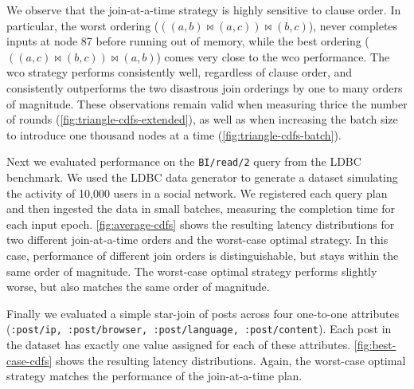 \documentclass[../catalog.tex]{subfiles}
\begin{document}
We observe that the join-at-a-time strategy is highly sensitive to
clause order. In particular, the worst ordering ($((a,b) \bowtie
(a,c)) \bowtie (b,c)$), never completes inputs at node 87 before
running out of memory, while the best ordering ($((a,c) \bowtie (b,c))
\bowtie (a,b)$) comes very close to the wco performance. The wco
strategy performs consistently well, regardless of clause order, and
consistently outperforms the two disastrous join orderings by one to
many orders of magnitude. These observations remain valid when
measuring thrice the number of rounds
(\autoref{fig:triangle-cdfs-extended}), as well as when increasing the
batch size to introduce one thousand nodes at a time
(\autoref{fig:triangle-cdfs-batch}).

Next we evaluated performance on the \texttt{BI/read/2} query from the
LDBC benchmark. We used the LDBC data generator to generate a dataset
simulating the activity of 10,000 users in a social network. We
registered each query plan and then ingested the data in small
batches, measuring the completion time for each input
epoch. \autoref{fig:average-cdfs} shows the resulting latency
distributions for two different join-at-a-time orders and the
worst-case optimal strategy. In this case, performance of different
join orders is distinguishable, but stays within the same order of
magnitude. The worst-case optimal strategy performs slightly worse,
but also matches the same order of magnitude.

Finally we evaluated a simple star-join of posts across four
one-to-one attributes (\texttt{:post/ip, :post/browser,
  :post/language, :post/content}). Each post in the dataset has
exactly one value assigned for each of these
attributes. \autoref{fig:best-case-cdfs} shows the resulting latency
distributions. Again, the worst-case optimal strategy matches the
performance of the join-at-a-time plan.
\end{document}
